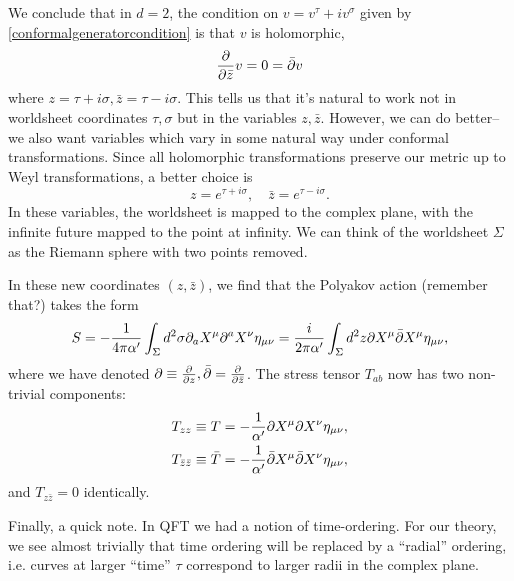 We conclude that in $d=2$, the condition on $v=v^\tau +i v^\sigma$ given by \ref{conformalgeneratorcondition} is that $v$ is holomorphic,
\begin{equation}
    \frac{\partial }{\partial \bar z} v = 0 = \bar {\partial} v
\end{equation}
where $z= \tau+i\sigma, \bar z = \tau-i\sigma$. This tells us that it's natural to work not in worldsheet coordinates $\tau,\sigma$ but in the variables $z,\bar z$. However, we can do better-- we also want variables which vary in some natural way under conformal transformations. Since all holomorphic transformations preserve our metric up to Weyl transformations, a better choice is
\begin{equation}
    z=e^{\tau +i\sigma},\quad \bar z= e^{\tau-i\sigma}.
\end{equation}
In these variables, the worldsheet is mapped to the complex plane, with the infinite future mapped to the point at infinity. We can think of the worldsheet $\Sigma$ as the Riemann sphere with two points removed.

In these new coordinates $(z,\bar z)$, we find that the Polyakov action (remember that?) takes the form
\begin{equation}
    S=-\frac{1}{4\pi \alpha'} \int_\Sigma d^2\sigma \partial_a X^\mu \partial^a X^\nu \eta_{\mu\nu}=\frac{i}{2\pi \alpha'}\int_\Sigma d^2 z \partial X^\mu \bar {\partial} X^\mu \eta_{\mu\nu},
\end{equation}
where we have denoted $\partial\equiv \frac{\partial }{\partial z},\bar {\partial}=\frac{\partial }{\partial \bar z}$.
The stress tensor $T_{ab}$ now has two non-trivial components:
\begin{align}
    T_{zz}&\equiv T =-\frac{1}{\alpha'} \partial X^\mu \partial X^\nu \eta_{\mu\nu},\\
    T_{\bar z \bar z} &\equiv \bar T = -\frac{1}{\alpha'} \bar {\partial} X^\mu \bar {\partial} X^\nu \eta_{\mu\nu},
\end{align}
and $T_{z\bar z}=0$ identically.

Finally, a quick note. In QFT we had a notion of time-ordering. For our theory, we see almost trivially that time ordering will be replaced by a ``radial'' ordering, i.e. curves at larger ``time'' $\tau$ correspond to larger radii in the complex plane.
